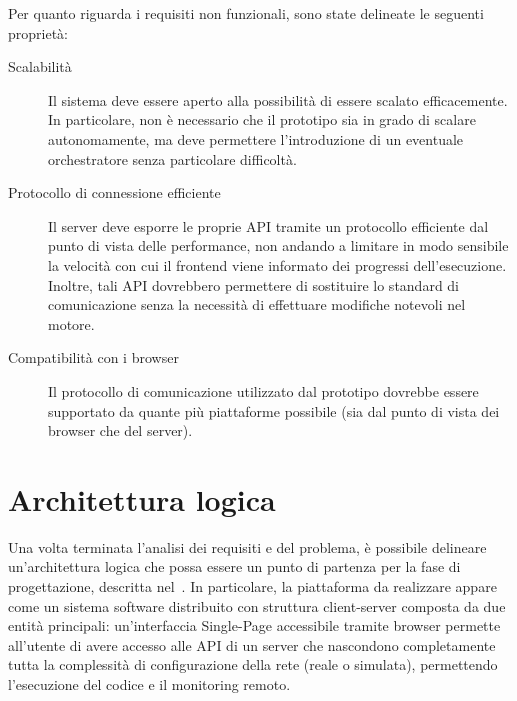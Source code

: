       Per quanto riguarda i requisiti non funzionali, sono state delineate le seguenti proprietà:

      \begin{description}
        \item[Scalabilità]
          Il sistema deve essere aperto alla possibilità di essere scalato efficacemente.
          In particolare, non è necessario che il prototipo sia in grado di scalare autonomamente, ma deve permettere l'introduzione di un eventuale orchestratore senza particolare difficoltà.

        \item[Protocollo di connessione efficiente]
          Il server deve esporre le proprie API tramite un protocollo efficiente dal punto di vista delle performance, non andando a limitare in modo sensibile la velocità con cui il frontend viene informato dei progressi dell'esecuzione.
          Inoltre, tali API dovrebbero permettere di sostituire lo standard di comunicazione senza la necessità di effettuare modifiche notevoli nel motore.

        \item[Compatibilità con i browser]
          Il protocollo di comunicazione utilizzato dal prototipo dovrebbe essere supportato da quante più piattaforme possibile (sia dal punto di vista dei browser che del server).
      \end{description}

  \section{Architettura logica}\label{sec:arch-logica}

  Una volta terminata l'analisi dei requisiti e del problema, è possibile delineare un'architettura logica che possa essere un punto di partenza per la fase di progettazione, descritta nel~.
  In particolare, la piattaforma da realizzare appare come un sistema software distribuito con struttura client-server composta da due entità principali:
  un'interfaccia Single-Page accessibile tramite browser permette all'utente di avere accesso alle API di un server che nascondono completamente tutta la complessità di configurazione della rete (reale o simulata), permettendo l'esecuzione del codice e il monitoring remoto.
